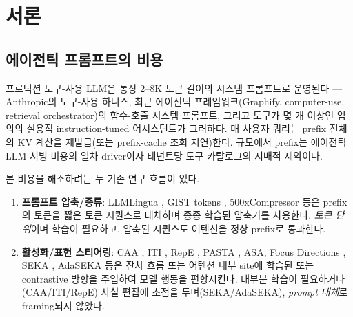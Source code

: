 \documentclass{article}
\theoremstyle{definition}
\begin{document}
\begin{abstract}
\paragraph{Negative result on autoregressive generation.}
그러나 본 first-token 회복은 \emph{multi-step 자기회귀 generation}으로 \emph{이전되지 않는다}. MetaTool Subtask 4 위 두 모델 multi-tool 호출 평가에서 (N=64, JSON tool-call 채점), 정적 rank-1과 정적+Q-bias hybrid 모두 \textbf{F1 = 0.000}을 기록했다 (full prompt 베이스라인: Qwen 0.7495, Llama 0.8745). 분포의 \emph{1차 통계} (mean attention output) 회복이 \emph{trajectory}의 회복을 함의하지 않는다는 결과로, 정리 1·2의 정확한 적용 범위를 한정한다. 자세한 분석과 함의는 \cref{sec:results-multistep}, \cref{sec:trajectory-vs-firstmoment}.
\end{abstract}

\section{서론}
\label{sec:intro}

\subsection{에이전틱 프롬프트의 비용}
프로덕션 도구-사용 LLM은 통상 2--8K 토큰 길이의 시스템 프롬프트로 운영된다 — Anthropic의 도구-사용 하니스, 최근 에이전틱 프레임워크(Graphify, computer-use, retrieval orchestrator)의 함수-호출 시스템 프롬프트, 그리고 도구가 몇 개 이상인 임의의 실용적 instruction-tuned 어시스턴트가 그러하다. 매 사용자 쿼리는 prefix 전체의 KV 계산을 재발급(또는 prefix-cache 조회 지연)한다. 규모에서 prefix는 에이전틱 LLM 서빙 비용의 일차 driver이자 테넌트당 도구 카탈로그의 지배적 제약이다.

본 비용을 해소하려는 두 기존 연구 흐름이 있다.
\begin{enumerate}[leftmargin=*]
\item \textbf{프롬프트 압축/증류}: LLMLingua \citep{jiang2023llmlingua}, GIST tokens \citep{mu2023gist}, 500xCompressor \citep{li2024compressor} 등은 prefix의 토큰을 짧은 토큰 시퀀스로 대체하며 종종 학습된 압축기를 사용한다. \emph{토큰 단위}이며 학습이 필요하고, 압축된 시퀀스도 어텐션을 정상 prefix로 통과한다.
\item \textbf{활성화/표현 스티어링}: CAA \citep{rimsky2024caa}, ITI \citep{li2023iti}, RepE \citep{zou2023repe}, PASTA \citep{zhang2023pasta}, ASA, Focus Directions \citep{zhu2025focus}, SEKA \citep{lee2025seka}, AdaSEKA 등은 잔차 흐름 또는 어텐션 내부 site에 학습된 또는 contrastive 방향을 주입하여 모델 행동을 편향시킨다. 대부분 학습이 필요하거나(CAA/ITI/RepE) 사실 편집에 초점을 두며(SEKA/AdaSEKA), \emph{prompt 대체}로 framing되지 않았다.
\end{enumerate}
\end{document}
